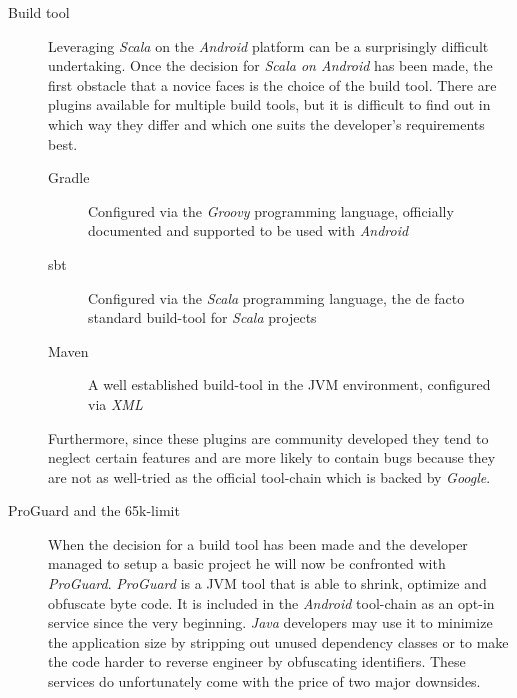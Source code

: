 \begin{description}

	\item[Build tool]\hfill

	Leveraging \textit{Scala} on the \textit{Android} platform can be a surprisingly difficult undertaking. Once the decision for \textit{Scala on Android} has been made, the  first obstacle that a novice faces is the choice of the build tool. There are plugins available for multiple build tools, but it is difficult to find out in which way they differ and which one suits the developer's requirements best.

	\begin{description}

		\item[Gradle]\hfill

		Configured via the \textit{Groovy} programming language, officially documented and supported to be used with \textit{Android}

		\item[\ac{sbt}]\hfill

		Configured via the \textit{Scala} programming language, the de facto standard build-tool for \textit{Scala} projects

		\item[Maven]\hfill

		A well established build-tool in the \ac{JVM} environment, configured via \textit{XML}

	\end{description}

	Furthermore, since these plugins are community developed they tend to neglect certain features and are more likely to contain bugs because they are not as well-tried as the official tool-chain which is backed by \textit{Google}.

	\item[ProGuard and the 65k-limit]\hfill

	When the decision for a build tool has been made and the developer managed to setup a basic project he will now be confronted with \textit{ProGuard}. \textit{ProGuard} is a \ac{JVM} tool that is able to shrink, optimize and obfuscate byte code. It is included in the \textit{Android} tool-chain as an opt-in service since the very beginning. \textit{Java} developers may use it to minimize the application size by stripping out unused dependency classes or to make the code harder to reverse engineer by obfuscating identifiers. These services do unfortunately come with the price of two major downsides.


\end{description}
